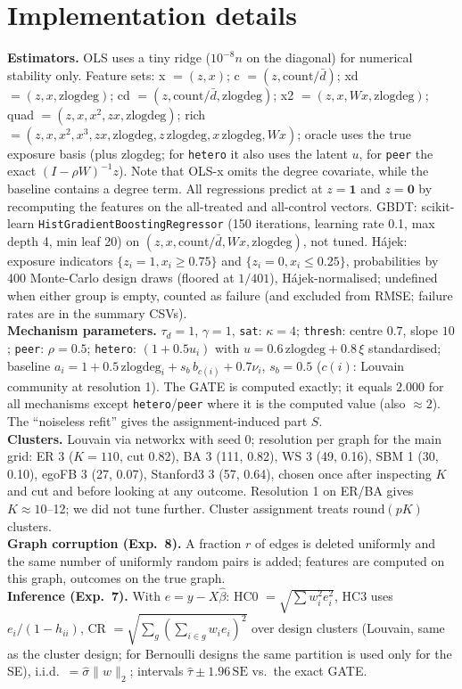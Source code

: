 \section{Implementation details}
\textbf{Estimators.} OLS uses a tiny ridge ($10^{-8}n$ on the diagonal) for numerical stability only. Feature sets: x $=(z,x)$; c $=(z,\mathrm{count}/\bar d)$; xd $=(z,x,\mathrm{zlogdeg})$; cd $=(z,\mathrm{count}/\bar d,\mathrm{zlogdeg})$; x2 $=(z,x,Wx,\mathrm{zlogdeg})$; quad $=(z,x,x^2,zx,\mathrm{zlogdeg})$; rich $=(z,x,x^2,x^3,zx,\mathrm{zlogdeg},z\,\mathrm{zlogdeg},x\,\mathrm{zlogdeg},Wx)$; oracle uses the true exposure basis (plus zlogdeg; for \texttt{hetero} it also uses the latent $u$, for \texttt{peer} the exact $(I-\rho W)^{-1}z$). Note that OLS-x omits the degree covariate, while the baseline contains a degree term. All regressions predict at $z{=}\mathbf 1$ and $z{=}\mathbf 0$ by recomputing the features on the all-treated and all-control vectors. GBDT: scikit-learn \texttt{HistGradientBoostingRegressor} (150 iterations, learning rate 0.1, max depth 4, min leaf 20) on $(z,x,\mathrm{count}/\bar d,Wx,\mathrm{zlogdeg})$, not tuned. H\'ajek: exposure indicators $\{z_i{=}1,x_i\ge0.75\}$ and $\{z_i{=}0,x_i\le0.25\}$, probabilities by 400 Monte-Carlo design draws (floored at $1/401$), H\'ajek-normalised; undefined when either group is empty, counted as failure (and excluded from RMSE; failure rates are in the summary CSVs).\\
\textbf{Mechanism parameters.} $\tau_d{=}1$, $\gamma{=}1$, \texttt{sat}: $\kappa{=}4$; \texttt{thresh}: centre $0.7$, slope $10$; \texttt{peer}: $\rho{=}0.5$; \texttt{hetero}: $(1+0.5u_i)$ with $u=0.6\,\mathrm{zlogdeg}+0.8\,\xi$ standardised; baseline $a_i=1+0.5\,\mathrm{zlogdeg}_i+s_b\,b_{c(i)}+0.7\nu_i$, $s_b{=}0.5$ ($c(i)$: Louvain community at resolution 1). The GATE is computed exactly; it equals $2.000$ for all mechanisms except \texttt{hetero}/\texttt{peer} where it is the computed value (also $\approx2$). The ``noiseless refit'' gives the assignment-induced part $S$.\\
\textbf{Clusters.} Louvain \citep{blondel2008} via networkx with seed 0; resolution per graph for the main grid: ER 3 ($K{=}110$, cut 0.82), BA 3 (111, 0.82), WS 3 (49, 0.16), SBM 1 (30, 0.10), egoFB 3 (27, 0.07), Stanford3 3 (57, 0.64), chosen once after inspecting $K$ and cut and before looking at any outcome. Resolution 1 on ER/BA gives $K\approx10$--12; we did not tune further. Cluster assignment treats $\mathrm{round}(pK)$ clusters.\\
\textbf{Graph corruption (Exp.~8).} A fraction $r$ of edges is deleted uniformly and the same number of uniformly random pairs is added; features are computed on this graph, outcomes on the true graph.\\
\textbf{Inference (Exp.~7).} With $e=y-X\hat\beta$: HC0 $=\sqrt{\sum w_i^2e_i^2}$, HC3 uses $e_i/(1-h_{ii})$, CR $=\sqrt{\sum_g(\sum_{i\in g}w_ie_i)^2}$ over design clusters (Louvain, same as the cluster design; for Bernoulli designs the same partition is used only for the SE), i.i.d.\ $=\hat\sigma\|w\|_2$; intervals $\hat\tau\pm1.96\,\mathrm{SE}$ vs.\ the exact GATE.

